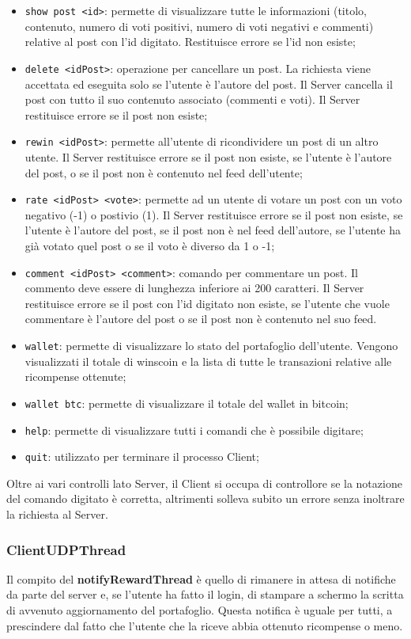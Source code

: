 \documentclass[11pt, a4paper, oneside]{article}
\begin{document}
\begin{itemize}
    \item \texttt{show post <id>}: permette di visualizzare tutte le informazioni (titolo, contenuto, numero di voti positivi, numero di voti negativi e
    commenti) relative al post con l'id digitato. Restituisce errore se l'id non esiste;
    \item \texttt{delete <idPost>}: operazione per cancellare un post. La richiesta viene accettata ed eseguita solo se l’utente è l’autore del post. Il Server cancella 
    il post con tutto il suo contenuto associato (commenti e voti). Il Server restituisce errore se il post non esiste;
    \item \texttt{rewin <idPost>}:  permette all'utente di ricondividere un post di un altro utente. Il Server restituisce errore se il post non esiste, se l'utente è
    l'autore del post, o se il post non è contenuto nel feed dell'utente;
    \item \texttt{rate <idPost> <vote>}: permette ad un utente di votare un post con un voto negativo (-1) o postivio (1). Il Server restituisce errore se il post non esiste, 
    se l'utente è l'autore del post, se il post non è nel feed dell'autore, se l'utente ha già votato quel post o se il voto è diverso da 1 o -1;
    \item \texttt{comment <idPost> <comment>}: comando per commentare un post. Il commento deve essere di lunghezza inferiore ai 200 caratteri. 
    Il Server restituisce errore se il post con l'id digitato non esiste, se l'utente che vuole commentare
    è l'autore del post o se il post non è contenuto nel suo feed.
    \item \texttt{wallet}: permette di visualizzare lo stato del portafoglio dell'utente. Vengono visualizzati il totale di winscoin e la lista di tutte le transazioni
    relative alle ricompense ottenute;
    \item \texttt{wallet btc}: permette di visualizzare il totale del wallet in bitcoin;
    \item \texttt{help}: permette di visualizzare tutti i comandi che è possibile digitare;
    \item \texttt{quit}: utilizzato per terminare il processo Client;
\end{itemize}  
Oltre ai vari controlli lato Server, il Client si occupa di controllore se la notazione del comando digitato è corretta, altrimenti solleva subito un errore senza
inoltrare la richiesta al Server.
\subsubsection{ClientUDPThread}
Il compito del \textbf{notifyRewardThread} è quello di rimanere in attesa di notifiche da parte del server e, se l'utente ha fatto il login, di stampare
a schermo la scritta di avvenuto aggiornamento del portafoglio. Questa notifica è uguale per tutti, a prescindere dal fatto che l'utente che la riceve abbia ottenuto 
ricompense o meno.
\end{document}
